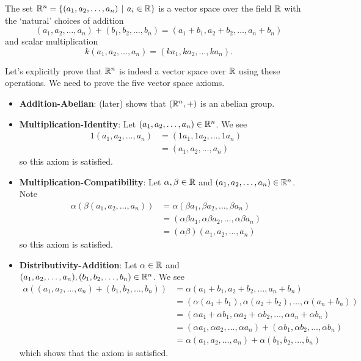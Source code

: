 \begin{example}\label{example-R^n-is-vector-space}
    The set $\R^n = \{(a_1, a_2, \dots, a_n) \vert a_i \in \R\}$ is a vector space over the field $\mathbb{R}$ with the `natural' choices of addition
    \[
        (a_1, a_2, \dots, a_n) + (b_1, b_2, \dots, b_n) = (a_1 + b_1, a_2 + b_2, \dots, a_n + b_n)
    \]
    and scalar multiplication
    \[
        k(a_1, a_2, \dots, a_n) = (ka_1, ka_2, \dots, ka_n).
    \]

    Let's explicitly prove that $\mathbb{R}^n$ is indeed a vector space over $\mathbb{R}$ using these operations. We need to prove the five vector space axioms.
    \begin{itemize}
        \item \textbf{Addition-Abelian}:  (later) shows that $(\mathbb{R}^n, +)$ is an abelian group.

        \item \textbf{Multiplication-Identity}: Let $(a_1, a_2, \dots, a_n) \in \mathbb{R}^n$. We see
        \begin{align*}
            1(a_1, a_2, \dots, a_n) &= (1a_1, 1a_2, \dots, 1a_n)\\
            &= (a_1, a_2, \dots, a_n)
        \end{align*}
        so this axiom is satisfied.

        \item \textbf{Multiplication-Compatibility}: Let $\alpha, \beta \in \mathbb{R}$ and $(a_1, a_2, \dots, a_n) \in \mathbb{R}^n$. Note
        \begin{align*}
            \alpha\left(\beta(a_1, a_2, \dots, a_n)\right) &= \alpha(\beta a_1, \beta a_2, \dots, \beta a_n)\\
            &= (\alpha\beta a_1, \alpha\beta a_2, \dots, \alpha\beta a_n)\\
            &= (\alpha\beta)(a_1, a_2, \dots, a_n)
        \end{align*}
        so this axiom is satisfied.

        \item \textbf{Distributivity-Addition}: Let $\alpha \in \mathbb{R}$ and $(a_1, a_2, \dots, a_n), (b_1, b_2, \dots, b_n) \in \mathbb{R}^n$. We see
        \begin{align*}
            \alpha\left((a_1, a_2, \dots, a_n) + (b_1, b_2, \dots, b_n)\right) &= \alpha(a_1 + b_1, a_2 + b_2, \dots, a_n + b_n)\\
            &= (\alpha(a_1 + b_1), \alpha(a_2 + b_2), \dots, \alpha(a_n + b_n))\\
            &= (\alpha a_1 + \alpha b_1, \alpha a_2 + \alpha b_2, \dots, \alpha a_n + \alpha b_n)\\
            &= (\alpha a_1, \alpha a_2, \dots, \alpha a_n) + (\alpha b_1, \alpha b_2, \dots, \alpha b_n)\\
            &= \alpha(a_1, a_2, \dots, a_n) + \alpha(b_1, b_2, \dots, b_n)
        \end{align*}
        which shows that the axiom is satisfied.


\end{itemize}
\end{example}
